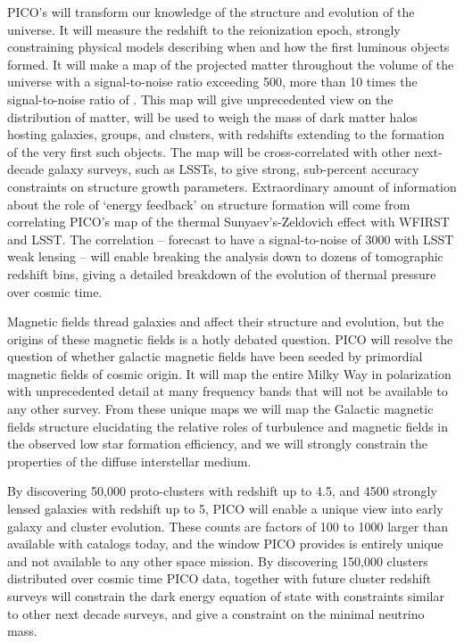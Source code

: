 \documentclass[PICOReport.tex]{subfiles}
\begin{document}
PICO's will transform our knowledge of the structure and evolution of the universe. It will measure the redshift to the reionization epoch, strongly constraining physical models describing when and how the first luminous objects formed. It will make a map of the projected matter throughout the volume of the universe with a signal-to-noise ratio exceeding 500, more than 10 times the signal-to-noise ratio of \planck. This map will give unprecedented view on the distribution of matter, will be used to weigh the mass of dark matter halos hosting galaxies, groups, and clusters, with redshifts extending to the formation of the very first such objects. The map will be cross-correlated with other next-decade galaxy surveys, such as LSSTs, to give strong, sub-percent accuracy constraints on structure growth parameters.  Extraordinary amount of information about the role of `energy feedback' on structure formation will come from correlating PICO's map of the thermal Sunyaev's-Zeldovich effect with WFIRST and LSST. The correlation -- forecast to have a signal-to-noise of 3000 with LSST weak lensing -- will enable breaking the analysis down to dozens of tomographic redshift bins, giving a detailed breakdown of the evolution of thermal pressure over cosmic time. 

Magnetic fields thread galaxies and affect their structure and evolution, but the origins of these magnetic fields is a hotly debated question. PICO will resolve the question of whether galactic magnetic fields have been seeded by primordial magnetic fields of cosmic origin. It will map the entire Milky Way in polarization with unprecedented detail at many frequency bands that will not be available to any other survey. From these unique maps we will map the Galactic magnetic fields structure elucidating the relative roles of turbulence and magnetic fields in the observed low star formation efficiency, and we will strongly constrain the properties of the diffuse interstellar medium. 

By discovering 50,000 proto-clusters with redshift up to 4.5, and  4500 strongly lensed galaxies with redshift up to 5, PICO will enable a unique view into early galaxy and cluster evolution. These counts are factors of 100 to 1000 larger than available with catalogs today, and the window PICO provides is entirely unique and not available to any other space mission. By discovering 150,000 clusters distributed over cosmic time PICO data, together with future cluster redshift surveys will constrain the dark energy equation of state with constraints similar to other next decade surveys, and give a constraint on the minimal neutrino mass. 
\end{document}
